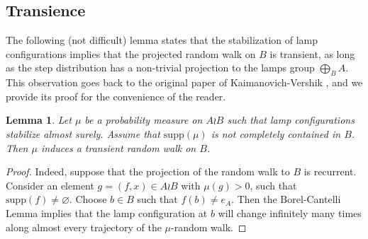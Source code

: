 \documentclass[reqno,oneside,11pt]{amsart}
\newcommand{\supp}[1]{\mathrm{supp}(#1)}
\theoremstyle{plain}
\newtheorem{lem}[thm]{Lemma}
\theoremstyle{definition}
\begin{document}
\subsection{Transience}
The following (not difficult) lemma states that the stabilization of lamp configurations implies that the projected random walk on $B$ is transient, as long as the step distribution has a non-trivial projection to the lamps group $\bigoplus_{B} A$. This observation goes back to the original paper of Kaimanovich-Vershik \cite{KaimanovcihVershik1983}, and we provide its proof for the convenience of the reader.
\begin{lem}\label{lem: the rw on B is transient}
	Let $\mu$ be a probability measure on $A\wr B$ such that lamp configurations stabilize almost surely. Assume that $\supp{\mu}$ is not completely contained in $B$. Then $\mu$ induces a transient random walk on $B$.
\end{lem}
\begin{proof}
	Indeed, suppose that the projection of the random walk to $B$ is recurrent. Consider an element $g=(f,x)\in A\wr B$ with $\mu(g)>0$, such that $\supp{f}\neq \varnothing$. Choose $b\in B$ such that $f(b)\neq e_A$. Then the Borel-Cantelli Lemma \cite[Lemma 2 of Section VIII.3]{Feller1968} implies that the lamp configuration at $b$ will change infinitely many times along almost every trajectory of the $\mu$-random walk.
\end{proof}
\end{document}
